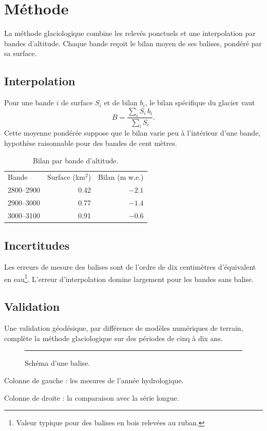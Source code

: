 \section{M\'ethode}
La m\'ethode glaciologique combine les relev\'es ponctuels et une
interpolation par bandes d'altitude. Chaque bande re\c{c}oit le
bilan moyen de ses balises, pond\'er\'e par sa surface.

\subsection{Interpolation}
Pour une bande $i$ de surface $S_i$ et de bilan $b_i$, le bilan
sp\'ecifique du glacier vaut
\[
  B = \frac{\sum_i S_i\, b_i}{\sum_i S_i}.
\]
Cette moyenne pond\'er\'ee suppose que le bilan varie peu \`a
l'int\'erieur d'une bande, hypoth\`ese raisonnable pour des bandes
de cent m\`etres.

\begin{table}[h]
  \centering
  \begin{tabular}{lrr}
    Bande & Surface (km$^2$) & Bilan (m w.e.) \\
    2800--2900 & 0.42 & $-2.1$ \\
    2900--3000 & 0.77 & $-1.4$ \\
    3000--3100 & 0.91 & $-0.6$ \\
  \end{tabular}
  \caption{Bilan par bande d'altitude.}
\end{table}

\subsection{Incertitudes}
Les erreurs de mesure des balises sont de l'ordre de dix
centim\`etres d'\'equivalent en eau\footnote{Valeur typique pour
des balises en bois relev\'ees au ruban.}. L'erreur
d'interpolation domine largement pour les bandes sans balise.

\newpage
\subsection{Validation}
Une validation g\'eod\'esique, par diff\'erence de mod\`eles
num\'eriques de terrain, compl\`ete la m\'ethode glaciologique
sur des p\'eriodes de cinq \`a dix ans.

\begin{figure}[h]
  \centering
  \rule{30mm}{12mm}\hspace{4mm}%
  \caption{Sch\'ema d'une balise.}
\end{figure}

\noindent\begin{minipage}[t]{0.45\linewidth}
  Colonne de gauche : les mesures
  de l'ann\'ee hydrologique.
\end{minipage}\hfill
\begin{minipage}[t]{0.45\linewidth}
  Colonne de droite : la comparaison
  avec la s\'erie longue.
\end{minipage}
